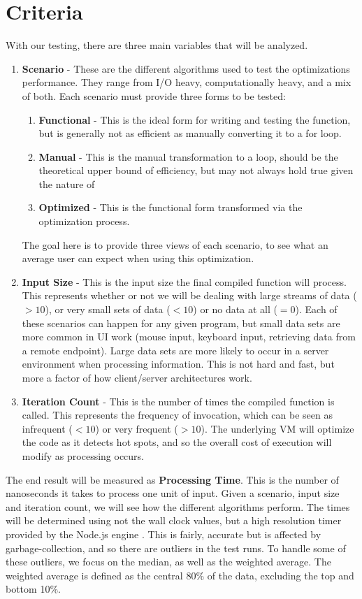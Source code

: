 \section{Criteria}

With our testing, there are three main variables that will be analyzed.

\begin{enumerate}
  \item \textbf{Scenario} - These are the different algorithms used to test the optimizations performance. They range from I/O heavy, computationally heavy, and a mix of both.  Each scenario must provide three forms to be tested:
    \begin{enumerate}
      \item \textbf{Functional} - This is the ideal form for writing and testing the function, but is generally not as efficient as manually converting it to a for loop.
      \item \textbf{Manual} - This is the manual transformation to a  loop, should be the theoretical upper bound of efficiency, but may not always hold true given the nature of \javascript
      \item \textbf{Optimized} - This is the functional form transformed via the optimization process.  
    \end{enumerate}
  The goal here is to provide three views of each scenario, to see what an average user can expect when using this optimization.
  \item \textbf{Input Size} - This is the input size the final compiled function will process.  This represents whether or not we will be dealing with large streams of data ($> 10$), or very small sets of data ($< 10$) or no data at all ($=0$).  Each of these scenarios can happen for any given program, but small data sets are more common in UI work (mouse input, keyboard input, retrieving data from a remote endpoint).  Large data sets are more likely to occur in a server environment when processing information. This is not hard and fast, but more a factor of how client/server architectures work. 
  \item \textbf{Iteration Count} - This is the number of times the compiled function is called.  This represents the frequency of invocation, which can be seen as infrequent ($< 10$) or very frequent ($> 10$).  The underlying VM will optimize the code as it detects hot spots, and so the overall cost of execution will modify as processing occurs.  
\end{enumerate}

The end result will be measured as \textbf{Processing Time}. This is the number of nanoseconds it takes to process one unit of input.  Given a scenario, input size and iteration count, we will see how the different algorithms perform.   The times will be determined using not the wall clock values, but a high resolution timer provided by the Node.js engine \cite{nodehr16}.  This is fairly, accurate but is affected by garbage-collection, and so there are outliers in the test runs. To handle some of these outliers, we focus on the median, as well as the weighted average. The weighted average is defined as the central 80\% of the data, excluding the top and bottom 10\%.
